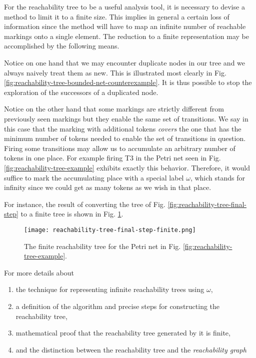 For the reachability tree to be a useful analysis tool,
it is necessary to devise a method to limit it to a finite size.
This implies in general a certain loss of information since the method will have to map
an infinite number of reachable markings onto a single element.
The reduction to a finite representation may be accomplished by the following means.

Notice on one hand that we may encounter duplicate nodes in our tree and we always naively treat them as new.
This is illustrated most clearly in Fig. \ref{fig:reachability-tree-bounded-net-counterexample}.
It is thus possible to stop the exploration of the successors of a duplicated node.

Notice on the other hand that some markings are strictly different from previously seen markings
but they enable the same set of transitions.
We say in this case that the marking with additional tokens \emph{covers} the one
that has the minimum number of tokens needed to enable the set of transitions in question.
Firing some transitions may allow us to accumulate an arbitrary number of tokens in one place.
For example firing T3 in the Petri net seen in Fig. \ref{fig:reachability-tree-example} exhibits exactly this behavior.
Therefore, it would suffice to mark the accumulating place with a special label $\omega$, which stands for infinity
since we could get as many tokens as we wish in that place.

For instance, the result of converting the tree of Fig. \ref{fig:reachability-tree-final-step}
to a finite tree is shown in Fig. \ref{fig:reachability-tree-final-step-finite}.

\begin{figure}[!htb]
    \centering
    \texttt{[image: reachability-tree-final-step-finite.png]}
    \caption{The finite reachability tree for the Petri net in Fig. \ref{fig:reachability-tree-example}.}
    \label{fig:reachability-tree-final-step-finite}
\end{figure}

For more details about

\begin{enumerate}
    \item the technique for representing infinite reachability trees using $\omega$,
    \item a definition of the algorithm and precise steps for constructing the reachability tree,
    \item mathematical proof that the reachability tree generated by it is finite,
    \item and the distinction between the reachability tree and the \emph{reachability graph}
\end{enumerate}

